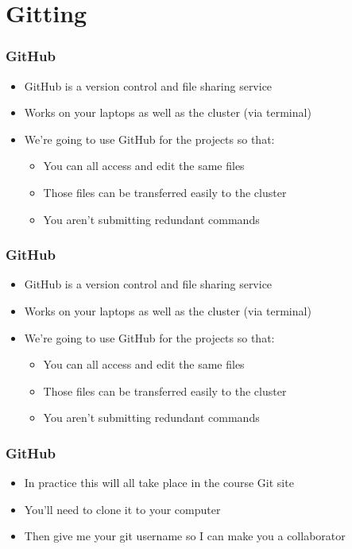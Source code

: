\documentclass[14pt]{beamer}
\begin{document}
\section{Gitting}

\begin{frame}
\frametitle{GitHub}
\begin{itemize}
	\item<+-> GitHub is a version control and file sharing service
	\item<+-> Works on your laptops as well as the cluster (via terminal)
	\item<+-> We're going to use GitHub for the projects so that:
	\begin{itemize}
		\item<+-> You can all access and edit the same files
		\item<+-> Those files can be transferred easily to the cluster
		\item<+-> You aren't submitting redundant commands
	\end{itemize}
\end{itemize}
\end{frame}

\begin{frame}
\frametitle{GitHub}
\begin{itemize}
	\item<+-> GitHub is a version control and file sharing service
	\item<+-> Works on your laptops as well as the cluster (via terminal)
	\item<+-> We're going to use GitHub for the projects so that:
	\begin{itemize}
		\item<+-> You can all access and edit the same files
		\item<+-> Those files can be transferred easily to the cluster
		\item<+-> You aren't submitting redundant commands
	\end{itemize}
\end{itemize}
\end{frame}

\begin{frame}
\frametitle{GitHub}
\begin{itemize}
	\item<+-> In practice this will all take place in the course Git site
	\item<+-> You'll need to clone it to your computer
	\item<+-> Then give me your git username so I can make you a collaborator
\end{itemize}
\end{frame}
\end{document}
